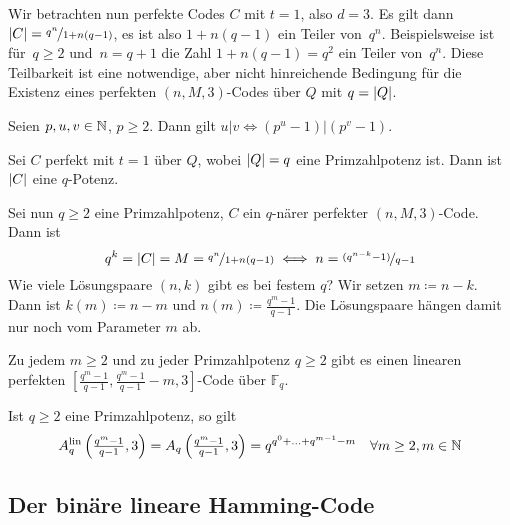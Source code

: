\documentclass{cheat-sheet}
\newcommand{\F}{\mathbb{F}} %
\newcommand{\lin}{\text{lin}} %
\newcommand{\divides}{|} %
\begin{document}
\begin{bem}
  Wir betrachten nun perfekte Codes $C$ mit $t=1$, also $d=3$.
  Es gilt dann $\lvert C\rvert = \nicefrac{q^n}{1 + n(q-1)}$, es ist also $1+n(q-1)$ ein Teiler von~$q^n$.
  Beispielsweise ist für~$q \geq 2$ und~$n = q+1$ die Zahl $1 + n(q-1) = q^2$ ein Teiler von~$q^n$.
  Diese Teilbarkeit ist eine notwendige, aber nicht hinreichende Bedingung für die Existenz eines perfekten $(n, M, 3)$-Codes über $Q$ mit $q = \lvert Q\rvert$.
\end{bem}

\begin{lem}
  Seien $p, u, v \in \mathbb{N}$, $p \geq 2$. Dann gilt $u \divides v \iff (p^u - 1) \divides (p^v - 1)$.
\end{lem}

\begin{prop}
  Sei $C$ perfekt mit $t=1$ über $Q$, wobei $\lvert Q\rvert = q$ eine Primzahlpotenz ist.
  Dann ist $\lvert C\rvert$ eine $q$-Potenz.
\end{prop}

\begin{bem}
  Sei nun $q \geq 2$ eine Primzahlpotenz, $C$ ein $q$-närer perfekter $(n, M, 3)$-Code.
  Dann ist
  \[ q^k = \lvert C\rvert = M = \nicefrac{q^n}{1 + n(q-1)} \iff n = \nicefrac{(q^{n-k} - 1)}{q - 1} \]
  Wie viele Lösungspaare $(n, k)$ gibt es bei festem $q$?
  Wir setzen $m \coloneqq n - k$.
  Dann ist $k(m) \coloneqq n - m$ und $n(m) \coloneqq \tfrac{q^m - 1}{q - 1}$.
  Die Lösungspaare hängen damit nur noch vom Parameter $m$ ab.
\end{bem}


\begin{satz}
  Zu jedem $m \geq 2$ und zu jeder Primzahlpotenz $q \geq 2$ gibt es einen linearen perfekten $[\tfrac{q^m - 1}{q - 1}, \tfrac{q^m - 1}{q - 1} - m, 3]$-Code über $\F_q$.
\end{satz}

\begin{kor}
  Ist $q \geq 2$ eine Primzahlpotenz, so gilt
  \[
    A^\lin_q \left( \tfrac{q^m - 1}{q - 1}, 3 \right) =
    A_q \left( \tfrac{q^m - 1}{q - 1}, 3 \right) =
    q^{q^0 + \ldots + q^{m-1} - m}
    \quad
    \forall m \geq 2, m \in \N
  \]
\end{kor}

\subsection{Der binäre lineare Hamming-Code}
\end{document}
